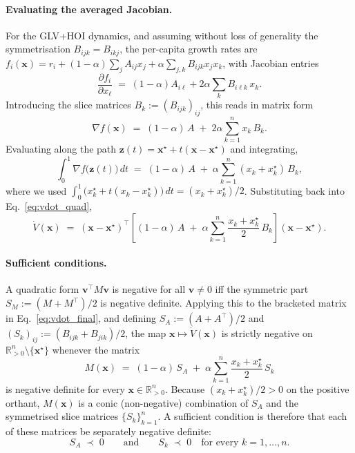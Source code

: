 \documentclass[pdflatex,sn-mathphys-num]{sn-jnl}%
\begin{document}
\paragraph{Evaluating the averaged Jacobian.} For the GLV+HOI dynamics, and assuming without loss of generality the symmetrisation $B_{ijk} = B_{ikj}$, the per-capita growth rates are $f_i(\mathbf{x}) = r_i + (1-\alpha)\sum_j A_{ij} x_j + \alpha \sum_{j,k} B_{ijk} x_j x_k$, with Jacobian entries
\begin{equation}\label{eq:nablaf_entries}
\frac{\partial f_i}{\partial x_\ell}
\;=\; (1-\alpha) A_{i\ell} + 2\alpha \sum_{k} B_{i\ell k}\, x_k.
\end{equation}
Introducing the slice matrices $B_k := (B_{ijk})_{ij}$, this reads in matrix form
\begin{equation}
\nabla f(\mathbf{x}) \;=\; (1-\alpha)\, A \;+\; 2\alpha \sum_{k=1}^{n} x_k\, B_k.
\end{equation}
Evaluating along the path $\mathbf{z}(t) = \mathbf{x}^\star + t(\mathbf{x} - \mathbf{x}^\star)$ and integrating,
\begin{equation}\label{eq:jacobian_avg}
\int_0^1 \nabla f\bigl(\mathbf{z}(t)\bigr)\, dt
\;=\; (1-\alpha)\, A \;+\; \alpha \sum_{k=1}^{n} (x_k + x_k^\star)\, B_k,
\end{equation}
where we used $\int_0^1 \bigl(x_k^\star + t(x_k - x_k^\star)\bigr)\, dt = (x_k + x_k^\star)/2$. Substituting back into Eq.~\eqref{eq:vdot_quad},
\begin{equation}\label{eq:vdot_final}
\dot{V}(\mathbf{x}) \;=\; (\mathbf{x} - \mathbf{x}^\star)^\top \left[ (1-\alpha)\, A \;+\; \alpha \sum_{k=1}^{n} \frac{x_k + x_k^\star}{2}\, B_k \right] (\mathbf{x} - \mathbf{x}^\star).
\end{equation}

\paragraph{Sufficient conditions.} A quadratic form $\mathbf{v}^\top M \mathbf{v}$ is negative for all $\mathbf{v} \neq 0$ iff the symmetric part $S_M := (M + M^\top)/2$ is negative definite. Applying this to the bracketed matrix in Eq.~\eqref{eq:vdot_final}, and defining $S_A := (A + A^\top)/2$ and $(S_k)_{ij} := (B_{ijk} + B_{jik})/2$, the map $\mathbf{x} \mapsto \dot V(\mathbf{x})$ is strictly negative on $\mathbb{R}^n_{>0} \setminus \{\mathbf{x}^\star\}$ whenever the matrix
\begin{equation}\label{eq:Mx}
M(\mathbf{x}) \;=\; (1-\alpha)\, S_A \;+\; \alpha \sum_{k=1}^{n} \frac{x_k + x_k^\star}{2}\, S_k
\end{equation}
is negative definite for every $\mathbf{x} \in \mathbb{R}^n_{>0}$. Because $(x_k + x_k^\star)/2 > 0$ on the positive orthant, $M(\mathbf{x})$ is a conic (non-negative) combination of $S_A$ and the symmetrised slice matrices $\{S_k\}_{k=1}^n$. A sufficient condition is therefore that each of these matrices be separately negative definite:
\begin{equation}\label{eq:slicewise}
S_A \;\prec\; 0 \qquad \text{and} \qquad S_k \;\prec\; 0 \quad \text{for every } k = 1, \ldots, n.
\end{equation}
\end{document}
